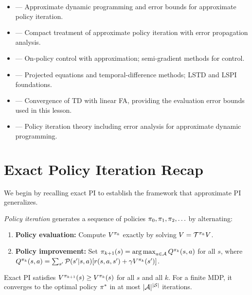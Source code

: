 \documentclass[11pt,a4paper]{article}
\begin{document}
\begin{itemize}[leftmargin=2em]
  \item \citet[Chapter 6]{bertsekas1996} --- Approximate dynamic
    programming and error bounds for approximate policy iteration.
  \item \citet[Chapter 3]{szepesvari2010} --- Compact treatment of
    approximate policy iteration with error propagation analysis.
  \item \citet[Chapter 10]{suttonbarto2018} --- On-policy control
    with approximation; semi-gradient methods for control.
  \item \citet{bertsekas2009} --- Projected equations and
    temporal-difference methods; LSTD and LSPI foundations.
  \item \citet{tsitsiklis1997} --- Convergence of TD with linear FA,
    providing the evaluation error bounds used in this lesson.
  \item \citet{puterman2014} --- Policy iteration theory including
    error analysis for approximate dynamic programming.
\end{itemize}

\section{Exact Policy Iteration Recap}
\label{sec:exact_pi}

We begin by recalling exact PI to establish the framework that
approximate PI generalizes.

\begin{definition}
\label{def:pi}
\emph{Policy iteration} generates a sequence of policies
$\pi_0, \pi_1, \pi_2, \ldots$ by alternating:
\begin{enumerate}
  \item \textbf{Policy evaluation:} Compute $V^{\pi_k}$ exactly
    by solving $V = \mathcal{T}^{\pi_k} V$.
  \item \textbf{Policy improvement:} Set
    $\pi_{k+1}(s) = \operatorname{arg\,max}_{a \in \mathcal{A}}
    Q^{\pi_k}(s,a)$ for all $s$, where
    $Q^{\pi_k}(s,a) = \sum_{s'} \mathcal{P}(s'|s,a)[r(s,a,s')
    + \gamma V^{\pi_k}(s')]$.
\end{enumerate}
\end{definition}

\begin{proposition}
\label{prop:exact_pi}
Exact PI satisfies $V^{\pi_{k+1}}(s) \geq V^{\pi_k}(s)$ for
all $s$ and all $k$. For a finite MDP, it converges to the optimal
policy $\pi^*$ in at most $|\mathcal{A}|^{|\mathcal{S}|}$ iterations.
\end{proposition}
\end{document}
